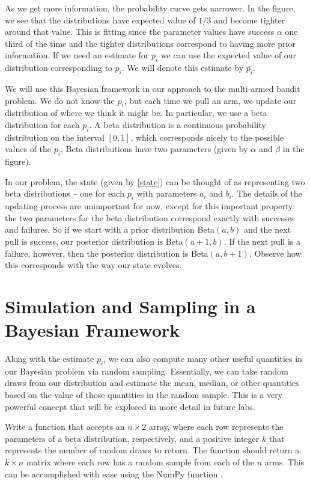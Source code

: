 As we get more information, the probability curve gets narrower.
In the figure, we see that the distributions have expected
value of $1/3$ and become tighter around that value.
This is fitting since the parameter values have success $\alpha$ one
third of the time and the tighter distributions correspond to having
more prior information.  If we need an estimate for $p_i$ we can use
the expected value of our distribution corresponding to $p_i$.
We will denote this estimate by $\overline{p_i}$.

We will use this Bayesian framework in our approach to the multi-armed bandit problem.
We do not know the $p_i$, but each time we pull an arm, we update our distribution of
where we think it might be.
In particular, we use a beta distribution for each $p_i$.
A beta distribution is a continuous probability distribution on the interval $[0,1]$,
which corresponds nicely to the possible values of the $p_i$.  Beta distributions have
two parameters (given by $\alpha$ and $\beta$ in the figure).

In our problem, the state (given by \eqref{state}) can be thought of as representing two
beta distributions -- one for each $p_i$ with parameters $a_i$ and $b_i$.
The details of the updating process are unimportant for now, except
for this important property: the two parameters for the beta distribution
correspond exactly with successes and failures.
So if we start with a prior distribution Beta$(a,b)$ and the next pull is success,
our posterior distribution is Beta$(a+1,b)$. If the next pull is a failure, however, then
the posterior distribution is Beta$(a,b+1)$.
Observe how this corresponds with the way our state evolves.

\section*{Simulation and Sampling in a Bayesian Framework}
Along with the estimate $\overline{p_i}$, we can also compute many other useful
quantities in our Bayesian problem via random sampling.  Essentially, we can take
random draws from our distribution and estimate the mean, median, or other
quantities based on the value of those quantities in the random sample.
This is a very powerful concept that will be explored in more detail in future labs.

\begin{problem}
Write a function  that accepts an $n\times 2$ array, where each
row represents the parameters of a beta distribution, respectively, and a positive integer $k$
that represents the number of random draws to return.
The function should return a $k\times n$ matrix where each row has a random sample
from each of the $n$ arms.  This can be accomplished with ease using the NumPy function
.
\label{prob:simdata}
\end{problem}

